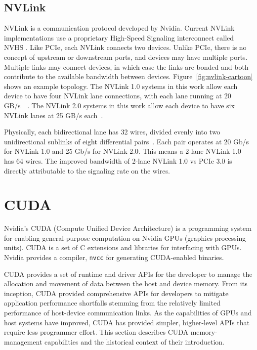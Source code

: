 \subsection{NVLink}

NVLink is a communication protocol developed by Nvidia.
Current NVLink implementations use a proprietary High-Speed Signaling interconnect called NVHS \cite{harris2016insidepascal}.
Like PCIe, each NVLink connects two devices.
Unlike PCIe, there is no concept of upstream or downstream ports, and devices may have multiple ports.
Multiple links may connect devices, in which case the links are bonded and both contribute to the available bandwidth between devices.
Figure~\ref{fig:nvlink-cartoon} shows an example topology.
The NVLink 1.0 systems in this work allow each device to have four NVLink lane connections, with each lane running at 20 GB/s~\cite{nvidia2017dgx1}~\cite{nvidia2016p100}.
The NVLink 2.0 systems in this work allow each device to have six NVLink lanes at 25 GB/s each~\cite{nvidia2017v100}.

Physically, each bidirectional lane has 32 wires, divided evenly into two unidirectional sublinks of eight differential pairs~\cite{harris2016insidepascal}.
Each pair operates at 20 Gb/s for NVLink 1.0 and 25 Gb/s for NVLink 2.0.
This means a 2-lane NVLink 1.0 has 64 wires.
The improved bandwidth of 2-lane NVLink 1.0 vs PCIe 3.0 is directly attributable to the signaling rate on the wires.

\section{CUDA}
\label{sec:cuda}

Nvidia's CUDA (Compute Unified Device Architecture) is a programming system for enabling general-purpose computation on Nvidia GPUs (graphics processing units).
CUDA is a set of C extensions and libraries for interfacing with GPUs.
Nvidia provides a compiler, \texttt{nvcc} for generating CUDA-enabled binaries.

CUDA provides a set of runtime and driver APIs for the developer to manage the allocation and movement of data between the host and device memory.
From its inception, CUDA provided comprehensive APIs for developers to mitigate application performance shortfalls stemming from the relatively limited performance of host-device communication links.
As the capabilities of GPUs and host systems have improved, CUDA has provided simpler, higher-level APIs that require less programmer effort.
This section describes CUDA memory-management capabilities and the historical context of their introduction.

